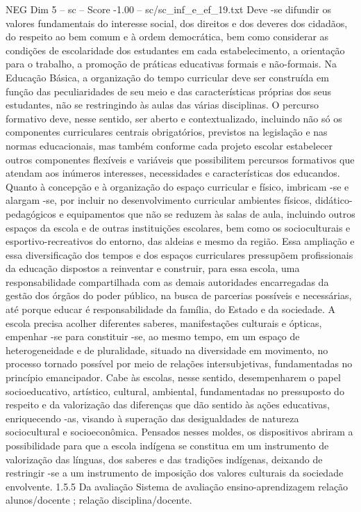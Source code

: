 \begin{textsample}{NEG Dim 5 – sc – Score -1.00 – sc/sc\_inf\_e\_ef\_19.txt}
Deve -se difundir os valores fundamentais do interesse social, dos direitos e dos deveres dos cidadãos, do respeito ao bem comum e à ordem democrática, bem como considerar as condições de escolaridade dos estudantes em cada estabelecimento, a orientação para o trabalho, a promoção de práticas educativas formais e não-formais.
Na Educação Básica, a organização do tempo curricular deve ser construída em função das peculiaridades de seu meio e das características próprias dos seus estudantes, não se restringindo às aulas das várias disciplinas.
O percurso formativo deve, nesse sentido, ser aberto e contextualizado, incluindo não só os componentes curriculares centrais obrigatórios, previstos na legislação e nas normas educacionais, mas também conforme cada projeto escolar estabelecer outros componentes flexíveis e variáveis que possibilitem percursos formativos que atendam aos inúmeros interesses, necessidades e características dos educandos.
Quanto à concepção e à organização do espaço curricular e físico, imbricam -se e alargam -se, por incluir no desenvolvimento curricular ambientes físicos, didático-pedagógicos e equipamentos que não se reduzem às salas de aula, incluindo outros espaços da escola e de outras instituições escolares, bem como os socioculturais e esportivo-recreativos do entorno, das aldeias e mesmo da região.
Essa ampliação e essa diversificação dos tempos e dos espaços curriculares pressupõem profissionais da educação dispostos a reinventar e construir, para essa escola, uma responsabilidade compartilhada com as demais autoridades encarregadas da gestão dos órgãos do poder público, na busca de parcerias possíveis e necessárias, até porque educar é responsabilidade da família, do Estado e da sociedade.
A escola precisa acolher diferentes saberes, manifestações culturais e ópticas, empenhar -se para constituir -se, ao mesmo tempo, em um espaço de heterogeneidade e de pluralidade, situado na diversidade em movimento, no processo tornado possível por meio de relações intersubjetivas, fundamentadas no princípio emancipador.
Cabe às escolas, nesse sentido, desempenharem o papel socioeducativo, artístico, cultural, ambiental, fundamentadas no pressuposto do respeito e da valorização das diferenças que dão sentido às ações educativas, enriquecendo -as, visando à superação das desigualdades de natureza sociocultural e socioeconômica.
Pensados nesses moldes, os dispositivos abriram a possibilidade para que a escola indígena se constitua em um instrumento de valorização das línguas, dos saberes e das tradições indígenas, deixando de restringir -se a um instrumento de imposição dos valores culturais da sociedade envolvente. 1.5.5 Da avaliação Sistema de avaliação ensino-aprendizagem relação alunos/docente ; relação disciplina/docente.

\end{textsample}
